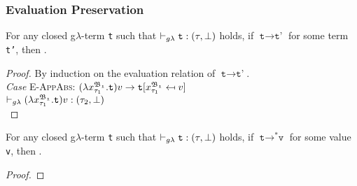 \subsubsection{Evaluation Preservation}
\begin{lemma}
	For any closed g$\lambda$-term \texttt{t} such that
	$\vdash_{g\lambda} \texttt{t} : (\tau, \bot)$ holds, 
	if	$\texttt{t} \rightarrow \texttt{t'}$ for some term \texttt{t'}, then
	 . 
\end{lemma}
\begin{proof} By induction on the evaluation relation of $\texttt{t} \rightarrow \texttt{t'}$. \\

\noindent\textit{Case} \textsc{E-AppAbs}: \qquad 
$(\lambda x^{\mathfrak{B_{1}}}_{\tau_{1}}.\texttt{t})v 
\rightarrow \texttt{t} [x^{\mathfrak{B_{1}}}_{\tau_{1}} \mapsfrom v]$ \\
 $\vdash_{g\lambda} (\lambda x^{\mathfrak{B_{1}}}_{\tau_{1}}.\texttt{t})v : (\tau_{2}, \bot) $ \\

% 
\noindent 
{}
 
\end{proof}

\begin{lemma}
	For any closed g$\lambda$-term \texttt{t} such that
	$\vdash_{g\lambda} \texttt{t} : (\tau, \bot)$ holds, 
	if	$\texttt{t} \rightarrow^{\ast} \texttt{v}$ for some value \texttt{v}, then
	 . 
\end{lemma}
\begin{proof}

\end{proof}






















